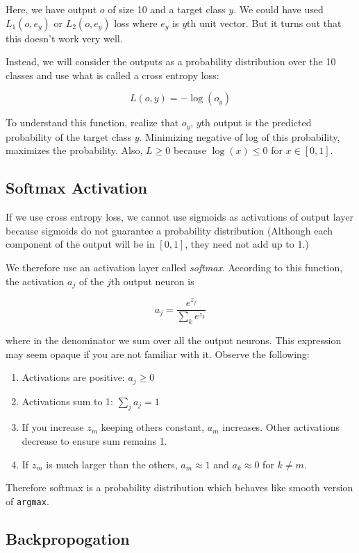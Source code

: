 \documentclass[a4paper]{tufte-handout}
\begin{document}
Here, we have output \(o\) of size 10 and a target class \(y\). We could
have used \(L_1(o, e_y)\) or \(L_2(o, e_y)\) loss where \(e_y\) is
\(y\)th unit vector. But it turns out that this doesn't work very well.

Instead, we will consider the outputs as a probability distribution over the
10 classes and use what is called a cross entropy loss:

\[ L(o, y) = - \log(o_y) \]

To understand this function, realize that \(o_y\), $y$th output is the predicted
probability of the target class \(y\). Minimizing negative of log of
this probability, maximizes the probability. Also, \(L \geq 0\) because
\(\log(x) \leq 0\) for \(x \in [0, 1]\).

\subsection{Softmax Activation}

If we use cross entropy loss, we cannot use sigmoids as activations of
output layer because sigmoids do not guarantee a probability
distribution (Although each component of the output will be in \([0, 1]\),
they need not add up to 1.)

We therefore use an activation layer called \emph{softmax}. According to
this function, the activation \(a_j\) of the \(j\)th output neuron is

\[ a_j = \frac{e^{z_j}}{\sum_k e^{z_k}} \]

where in the denominator we sum over all the output neurons.
This expression may seem opaque if you are not familiar with it. Observe
the following:

\begin{enumerate}
\item
  Activations are positive: \(a_j \geq 0\)
\item
  Activations sum to 1: \(\sum_j a_j = 1\)
\item
  If you increase \(z_m\) keeping others constant, \(a_m\) increases.
  Other activations decrease to ensure sum remains 1.
\item
  If \(z_m\) is much larger than the others, \(a_m \approx 1\) and
  \(a_k \approx 0\) for \(k \neq m\).
\end{enumerate}

Therefore softmax is a probability distribution which behaves like
smooth version of \texttt{argmax}.

\subsection{Backpropogation}\label{backpropogation}
\end{document}
